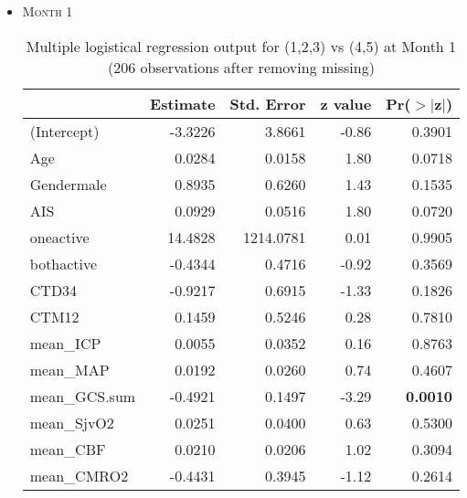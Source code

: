 \documentclass{article}
\begin{document}
\begin{itemize}
\item \textsc{Month 1}
\begin{table}[H]
\centering
\begin{tabular}{lrrrr}
  \hline
 & Estimate & Std. Error & z value & Pr($>$$|$z$|$) \\ 
  \hline
(Intercept) & -3.3226 & 3.8661 & -0.86 & 0.3901 \\ 
  Age & 0.0284 & 0.0158 & 1.80 & 0.0718 \\ 
  Gendermale & 0.8935 & 0.6260 & 1.43 & 0.1535 \\ 
  AIS & 0.0929 & 0.0516 & 1.80 & 0.0720 \\ 
  oneactive & 14.4828 & 1214.0781 & 0.01 & 0.9905 \\ 
  bothactive & -0.4344 & 0.4716 & -0.92 & 0.3569 \\ 
  CTD34 & -0.9217 & 0.6915 & -1.33 & 0.1826 \\ 
  CTM12 & 0.1459 & 0.5246 & 0.28 & 0.7810 \\ 
  mean\_ICP & 0.0055 & 0.0352 & 0.16 & 0.8763 \\ 
  mean\_MAP & 0.0192 & 0.0260 & 0.74 & 0.4607 \\ 
  mean\_GCS.sum & -0.4921 & 0.1497 & -3.29 & {\bf 0.0010} \\ 
  mean\_SjvO2 & 0.0251 & 0.0400 & 0.63 & 0.5300 \\ 
  mean\_CBF & 0.0210 & 0.0206 & 1.02 & 0.3094 \\ 
  mean\_CMRO2 & -0.4431 & 0.3945 & -1.12 & 0.2614 \\ 
   \hline
\end{tabular}
\caption{Multiple logistical regression output for (1,2,3) vs (4,5) at Month 1 (206 observations after removing missing)}
\end{table}



\end{itemize}
\end{document}
